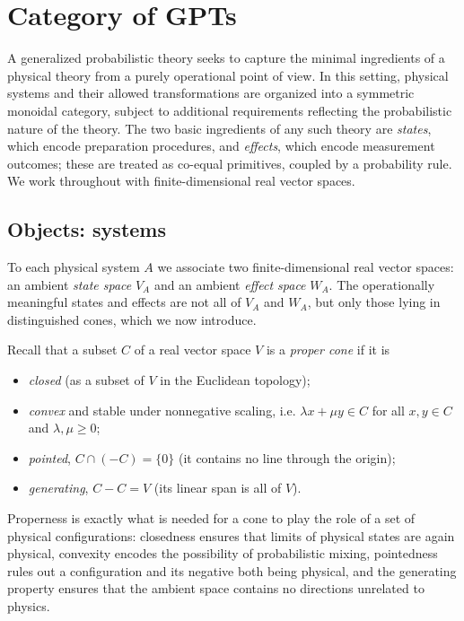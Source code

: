 \documentclass[prl,aps,10pt,superscriptaddress, floatfix]{revtex4-2}
\begin{document}
\section{Category of GPTs}

A generalized probabilistic theory seeks to capture the minimal ingredients of a physical theory from a purely operational point of view. In this setting, physical systems and their allowed transformations are organized into a symmetric monoidal category, subject to additional requirements reflecting the probabilistic nature of the theory. The two basic ingredients of any such theory are \emph{states}, which encode preparation procedures, and \emph{effects}, which encode measurement outcomes; these are treated as co-equal primitives, coupled by a probability rule. We work throughout with finite-dimensional real vector spaces.

\subsection{Objects: systems}

To each physical system $A$ we associate two finite-dimensional real vector spaces: an ambient \emph{state space} $V_A$ and an ambient \emph{effect space} $W_A$. The operationally meaningful states and effects are not all of $V_A$ and $W_A$, but only those lying in distinguished cones, which we now introduce.

Recall that a subset $C$ of a real vector space $V$ is a \emph{proper cone} if it is
\begin{itemize}
\item[(a)] \emph{closed} (as a subset of $V$ in the Euclidean topology);
\item[(b)] \emph{convex} and stable under nonnegative scaling, i.e. $\lambda x + \mu y \in C$ for all $x,y\in C$ and $\lambda,\mu\ge 0$;
\item[(c)] \emph{pointed}, $C\cap(-C)=\{0\}$ (it contains no line through the origin);
\item[(d)] \emph{generating}, $C-C=V$ (its linear span is all of $V$).
\end{itemize}
Properness is exactly what is needed for a cone to play the role of a set of physical configurations: closedness ensures that limits of physical states are again physical, convexity encodes the possibility of probabilistic mixing, pointedness rules out a configuration and its negative both being physical, and the generating property ensures that the ambient space contains no directions unrelated to physics.
\end{document}
